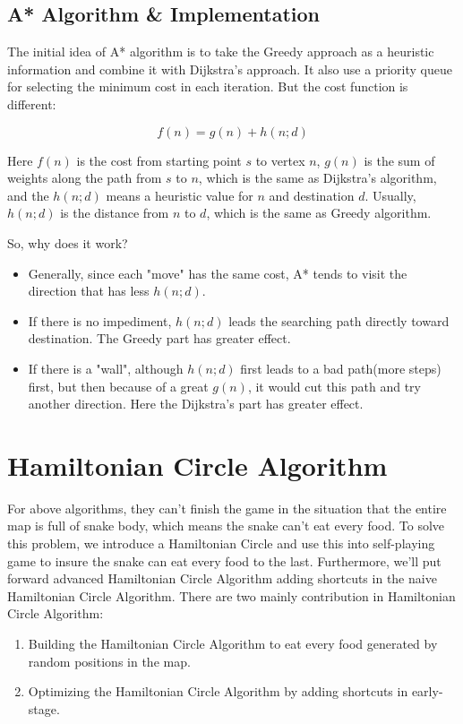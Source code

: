 \documentclass[12pt]{article}
\begin{document}
\subsection{A* Algorithm \& Implementation}

The initial idea of A* algorithm is to take the Greedy approach as a heuristic information and combine it with Dijkstra's approach. It also use a priority queue for selecting the minimum cost in each iteration. But the cost function is different:

\begin{equation*}
    f(n) = g(n) + h(n;d)
\end{equation*}

Here $f(n)$ is the cost from starting point $s$ to vertex $n$, $g(n)$ is the sum of weights 
along the path from $s$ to $n$, which is the same as Dijkstra's algorithm, and the $h(n;d)$ 
means a heuristic value for $n$ and destination $d$. Usually, $h(n;d)$ is the distance from $n$ 
to $d$, which is the same as Greedy algorithm.

So, why does it work?

\begin{itemize}
    \item Generally, since each "move" has the same cost, A* tends to visit the direction that has less $h(n;d)$.
    \item If there is no impediment, $h(n;d)$ leads the searching path directly toward destination. The Greedy part has greater effect.
    \item If there is a "wall", although $h(n;d)$ first leads to a bad path(more steps) first, but then because of a great $g(n)$, it would cut this path and try another direction. Here the Dijkstra's part has greater effect.
\end{itemize}

\section{Hamiltonian Circle Algorithm}

For above algorithms, they can't finish the game in the situation that the entire map is full of snake body, which means the snake can't eat every food. To solve this problem, we introduce a Hamiltonian Circle and use this into self-playing game to insure the snake can eat every food to the last. Furthermore, we'll put forward advanced Hamiltonian Circle Algorithm adding shortcuts in the naive Hamiltonian Circle Algorithm. There are two mainly contribution in Hamiltonian Circle Algorithm:
\begin{enumerate}
    \item Building the Hamiltonian Circle Algorithm to eat every food generated by random positions in the map. 
    \item Optimizing the Hamiltonian Circle Algorithm by adding shortcuts in early-stage.
\end{enumerate}
    
\end{document}
